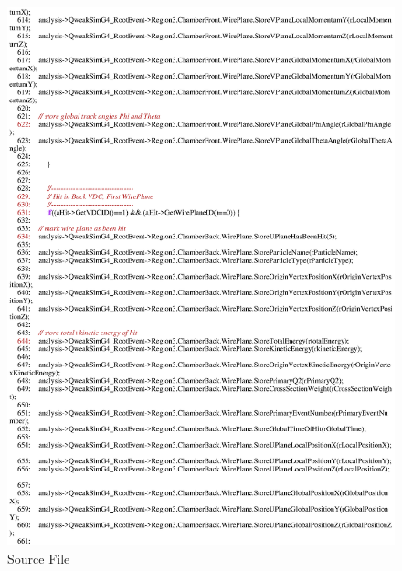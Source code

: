 \begin{figure}[h]
  \hspace{0cm}
  \includegraphics[scale=0.8]{./figures13/QweakSimEventAction.cc-p11.eps}
  \caption{Source File}
           \label{fig:XIII-SC-26}
\end{figure}

\clearpage

